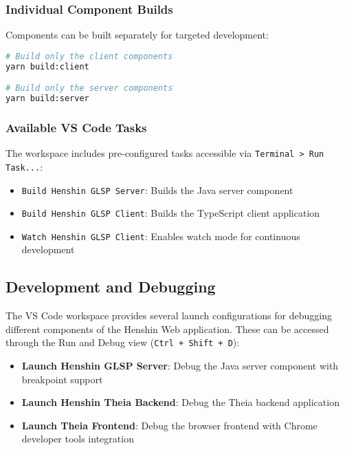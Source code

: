 \subsubsection{Individual Component Builds}

Components can be built separately for targeted development:

\begin{lstlisting}[language=bash]
# Build only the client components
yarn build:client

# Build only the server components  
yarn build:server
\end{lstlisting}

\subsubsection{Available VS Code Tasks}

The workspace includes pre-configured tasks accessible via \texttt{Terminal > Run Task...}:

\begin{itemize}
    \item \texttt{Build Henshin GLSP Server}: Builds the Java server component
    \item \texttt{Build Henshin GLSP Client}: Builds the TypeScript client application
    \item \texttt{Watch Henshin GLSP Client}: Enables watch mode for continuous development
\end{itemize}

\subsection{Development and Debugging}
\label{subsec:debugging}

The VS Code workspace provides several launch configurations for debugging different components of the Henshin Web application. These can be accessed through the Run and Debug view (\texttt{Ctrl + Shift + D}):

\begin{itemize}
    \item \textbf{Launch Henshin GLSP Server}: Debug the Java server component with breakpoint support
    \item \textbf{Launch Henshin Theia Backend}: Debug the Theia backend application
    \item \textbf{Launch Theia Frontend}: Debug the browser frontend with Chrome developer tools integration
\end{itemize}

